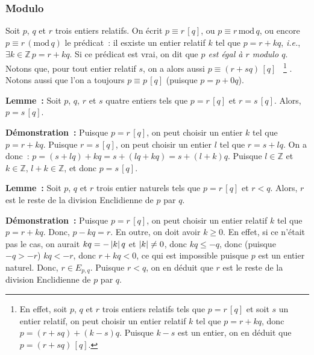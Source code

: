 \subsubsection{Modulo}

Soit $p$, $q$ et $r$ trois entiers relatifs. 
On écrit $p \equiv r \, [q]$, ou $p \equiv r \, \mathrm{mod} \, q$, ou encore $p \equiv r \, ( \mathrm{mod} \, q)$ le prédicat : il esxiste un entier relatif $k$ tel que $p = r + k q$, \textit{i.e.}, $\exists k \in \mathbb{Z} \, p = r + k q$. 
Si ce prédicat est vrai, on dit que \textit{$p$ est égal à $r$ modulo $q$}.
Notons que, pour tout entier relatif $s$, on a alors aussi $p \equiv (r + s q) \, [q]$%
~\footnote{
    En effet, soit $p$, $q$ et $r$ trois entiers relatifs tels que $p = r \, [q]$ et soit $s$ un entier relatif, on peut choisir un entier relatif $k$ tel que $p = r + k q$, donc $p = (r + s q) + (k - s) q$. 
    Puisque $k-s$ est un entier, on en déduit que $p = (r + s q) \, [q]$.
}%
.
Notons aussi que l'on a toujours $p \equiv p \, [q]$ (puisque $p = p + 0 q$). 

\medskip 

\noindent\textbf{Lemme :} Soit $p$, $q$, $r$ et $s$ quatre entiers tels que $p = r \, [q]$ et $r = s \, [q]$.
    Alors, $p = s \, [q]$.

\medskip 
    
\noindent\textbf{Démonstration :} 
    Puisque $p = r \, [q]$, on peut choisir un entier $k$ tel que $p = r + k q$.
    Puisque $r = s \, [q]$, on peut choisir un entier $l$ tel que $r = s + l q$.
    On a donc : $p = (s + l q) + k q = s + (l q + k q) = s + (l + k) q$.
    Puisque $l \in \mathbb{Z}$ et $k \in \mathbb{Z}$, $l + k \in \mathbb{Z}$, et donc $p = s \, [q]$.

    \done

\medskip 

\noindent\textbf{Lemme :} Soit $p$, $q$ et $r$ trois entier naturels tels que $p = r \, [q]$ et $r < q$.
    Alors, $r$ est le reste de la division Enclidienne de $p$ par $q$.

\medskip 
    
\noindent\textbf{Démonstration :}
    Puisque $p = r \, [q]$, on peut choisir un entier relatif $k$ tel que $p = r + k q$.
    Donc, $p - k q = r$.
    En outre, on doit avoir $k \geq 0$. 
    En effet, si ce n'était pas le cas, on aurait $k q = - \left\lvert k \right\rvert q$ et $\left\lvert k \right\rvert \neq 0$, donc $k q \leq -q$, donc (puisque $-q > -r$) $k q < -r$, donc $r + k q < 0$, ce qui est impossible puisque $p$ est un entier naturel.
    Donc, $r \in E_{p,q}$. 
    Puisque $r < q$, on en déduit que $r$ est le reste de la division Enclidienne de $p$ par $q$.


